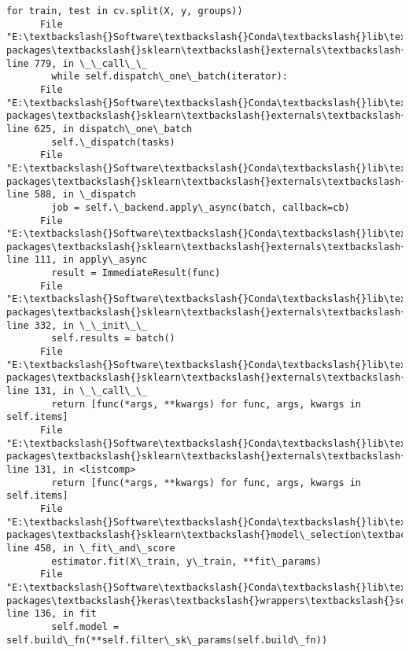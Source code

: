 \documentclass[11pt]{article}
\begin{document}
\begin{Verbatim}[commandchars=\\\{\}]
        for train, test in cv.split(X, y, groups))
      File "E:\textbackslash{}Software\textbackslash{}Conda\textbackslash{}lib\textbackslash{}site-packages\textbackslash{}sklearn\textbackslash{}externals\textbackslash{}joblib\textbackslash{}parallel.py", line 779, in \_\_call\_\_
        while self.dispatch\_one\_batch(iterator):
      File "E:\textbackslash{}Software\textbackslash{}Conda\textbackslash{}lib\textbackslash{}site-packages\textbackslash{}sklearn\textbackslash{}externals\textbackslash{}joblib\textbackslash{}parallel.py", line 625, in dispatch\_one\_batch
        self.\_dispatch(tasks)
      File "E:\textbackslash{}Software\textbackslash{}Conda\textbackslash{}lib\textbackslash{}site-packages\textbackslash{}sklearn\textbackslash{}externals\textbackslash{}joblib\textbackslash{}parallel.py", line 588, in \_dispatch
        job = self.\_backend.apply\_async(batch, callback=cb)
      File "E:\textbackslash{}Software\textbackslash{}Conda\textbackslash{}lib\textbackslash{}site-packages\textbackslash{}sklearn\textbackslash{}externals\textbackslash{}joblib\textbackslash{}\_parallel\_backends.py", line 111, in apply\_async
        result = ImmediateResult(func)
      File "E:\textbackslash{}Software\textbackslash{}Conda\textbackslash{}lib\textbackslash{}site-packages\textbackslash{}sklearn\textbackslash{}externals\textbackslash{}joblib\textbackslash{}\_parallel\_backends.py", line 332, in \_\_init\_\_
        self.results = batch()
      File "E:\textbackslash{}Software\textbackslash{}Conda\textbackslash{}lib\textbackslash{}site-packages\textbackslash{}sklearn\textbackslash{}externals\textbackslash{}joblib\textbackslash{}parallel.py", line 131, in \_\_call\_\_
        return [func(*args, **kwargs) for func, args, kwargs in self.items]
      File "E:\textbackslash{}Software\textbackslash{}Conda\textbackslash{}lib\textbackslash{}site-packages\textbackslash{}sklearn\textbackslash{}externals\textbackslash{}joblib\textbackslash{}parallel.py", line 131, in <listcomp>
        return [func(*args, **kwargs) for func, args, kwargs in self.items]
      File "E:\textbackslash{}Software\textbackslash{}Conda\textbackslash{}lib\textbackslash{}site-packages\textbackslash{}sklearn\textbackslash{}model\_selection\textbackslash{}\_validation.py", line 458, in \_fit\_and\_score
        estimator.fit(X\_train, y\_train, **fit\_params)
      File "E:\textbackslash{}Software\textbackslash{}Conda\textbackslash{}lib\textbackslash{}site-packages\textbackslash{}keras\textbackslash{}wrappers\textbackslash{}scikit\_learn.py", line 136, in fit
        self.model = self.build\_fn(**self.filter\_sk\_params(self.build\_fn))

\end{Verbatim}
\end{document}
